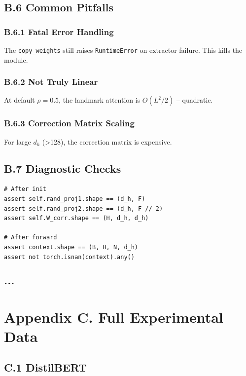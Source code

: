 \subsection{B.6 Common Pitfalls}

\subsubsection{B.6.1 Fatal Error Handling}

The \texttt{copy\_weights} still raises \texttt{RuntimeError} on extractor failure. This 
kills the module.

\subsubsection{B.6.2 Not Truly Linear}

At default $\rho = 0.5$, the landmark attention is $O(L^2/2)$ -- 
quadratic.

\subsubsection{B.6.3 Correction Matrix Scaling}

For large $d_h$ (>128), the correction matrix is expensive.

\subsection{B.7 Diagnostic Checks}

\begin{lstlisting}
# After init
assert self.rand_proj1.shape == (d_h, F)
assert self.rand_proj2.shape == (d_h, F // 2)
assert self.W_corr.shape == (H, d_h, d_h)

# After forward
assert context.shape == (B, H, N, d_h)
assert not torch.isnan(context).any()
\end{lstlisting}
\begin{lstlisting}

---
\end{lstlisting}

\section{Appendix C. Full Experimental Data}

\subsection{C.1 DistilBERT}

